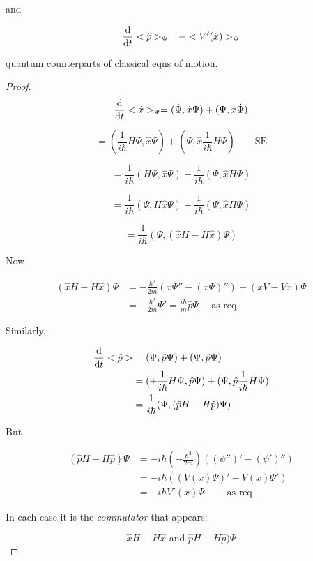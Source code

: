 \documentclass[a4paper]{article}
\begin{document}
and

\[ \frac{\mathrm{d} }{\mathrm{d} t}  <\hat{p}>_{\Psi} = - <V'(\hat{x})>_{\Psi} \]
	
quantum counterparts of classical eqns of motion.

\begin{proof}
	\[ \frac{\mathrm{d} }{\mathrm{d} t} <\hat{x}>_{\Psi} = (\dot{\Psi}, \hat{x} \Psi ) + (\Psi, \hat{x} \dot{\Psi} ) \]
	
	\[  = (\frac{1}{i \hbar}  H \Psi, \hat{x} \Psi  )   + (\Psi,  \hat{x} \frac{1}{i \hbar}  H \Psi   ) \qquad \text{SE} \]
	
	\[ = \frac{1}{i \hbar}(  H \Psi, \hat{x} \Psi  )   + \frac{1}{i \hbar}(\Psi,  \hat{x} H \Psi   ) \]
	
	\[ = \frac{1}{i \hbar}( \Psi, H \hat{x} \Psi  )   + \frac{1}{i \hbar}(\Psi,  \hat{x} H \Psi   ) \]
	
		\[ = \frac{1}{i \hbar}( \Psi, (\hat{x} H - H \hat{x}  ) \Psi   ) \]
	
	Now
	
	\begin{align*}
	(\hat{x} H - H \hat{x}  ) \Psi & = - \frac{\hbar^{2}}{2m}(x \Psi'' - (x \Psi)'') + (xV - Vx) \Psi  \\
	& = - \frac{\hbar^{2}}{2m} \Psi' = \frac{i\hbar}{m} \hat{p} \Psi \quad \text{ as req}
	\end{align*}
	
	
	Similarly, 
	
	\begin{align*}
	\frac{\mathrm{d} }{\mathrm{d} t}  <\hat{p}>  & =  (\dot{\Psi}, \hat{p} \Psi )  + (\Psi, \hat{p}  \dot{\Psi} )  \\
	& = (+ \frac{1}{i \hbar}H \Psi, \hat{p} \Psi  ) + (\Psi, \hat{p} \frac{1}{i \hbar } H \Psi  ) \\
	& = \frac{1}{i \hbar} (\Psi, (\hat{p}H - H\hat{p})\Psi  ) 
	\end{align*}
	
	But
	
	\begin{align*}
	(\hat{p}H - H\hat{p})\Psi& = - i \hbar \left( - \frac{\hbar^{2}}{2m} \right) \left(  (\psi'')' - (\psi')'' \right)   \\
	& = - i \hbar \left(  (V(x)\Psi)' - V(x)  \Psi' \right) \\
	& = - i \hbar V'(x) \Psi \qquad \text{ as req}
	\end{align*}
	
	In each case it is the \emph{commutator} that appears:
	
	\[ \hat{x} H - H \hat{x}  \text{ and } \hat{p}H - H\hat{p})\Psi\]
	
	
	
\end{proof}
\end{document}
